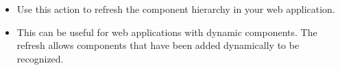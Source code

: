 
\begin{itemize}
\item Use this action to refresh the component hierarchy in your web application. 
\item This can be useful for web applications with dynamic components. The refresh allows components that have been added dynamically to be recognized. 
\end{itemize}
